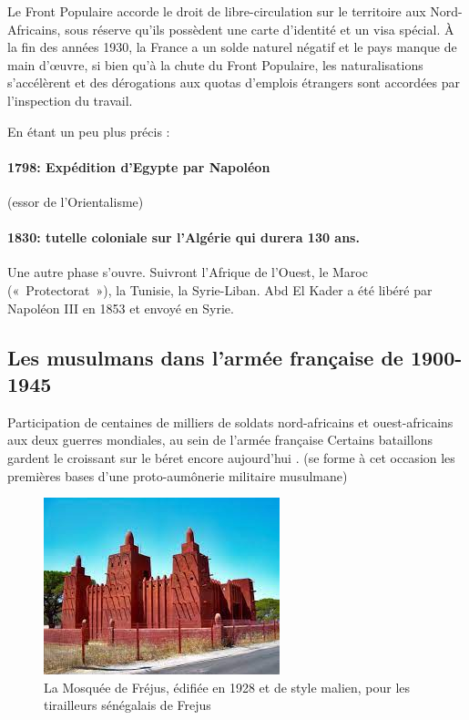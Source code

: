 Le Front Populaire accorde le droit de libre-circulation sur le
territoire aux Nord- Africains, sous réserve qu'ils possèdent une carte
d'identité et un visa spécial. À la fin des années 1930, la France a un
solde naturel négatif et le pays manque de main d'œuvre, si bien qu'à la
chute du Front Populaire, les naturalisations s'accélèrent et des
dérogations aux quotas d'emplois étrangers sont accordées par
l'inspection du travail.


En étant un peu plus précis : 

\paragraph{1798: Expédition d’Egypte par Napoléon}
(essor de l’Orientalisme)

\paragraph{1830: tutelle coloniale sur l’Algérie qui durera 130 ans.}
Une autre phase s'ouvre. 
Suivront l’Afrique de l’Ouest, le Maroc (« Protectorat »), la Tunisie, la Syrie-Liban. Abd El Kader a été libéré par Napoléon III en 1853 et envoyé en Syrie.




\subsection{Les musulmans dans l'armée française de 1900-1945}
{Participation de centaines de milliers de soldats nord-africains et ouest-africains aux deux guerres mondiales, au sein de l’armée française}
Certains bataillons gardent le croissant sur le béret encore aujourd'hui .
(se forme à cet occasion les premières bases d’une proto-aumônerie militaire musulmane) 
\begin{figure}
    \centering
    \includegraphics[width=\textwidth]{Images/MosqueeFrejus.jpg}
    \caption{La Mosquée de Fréjus, édifiée en 1928 et de style malien, pour les tirailleurs sénégalais de Frejus}
    \label{fig:Frejus}
\end{figure}




